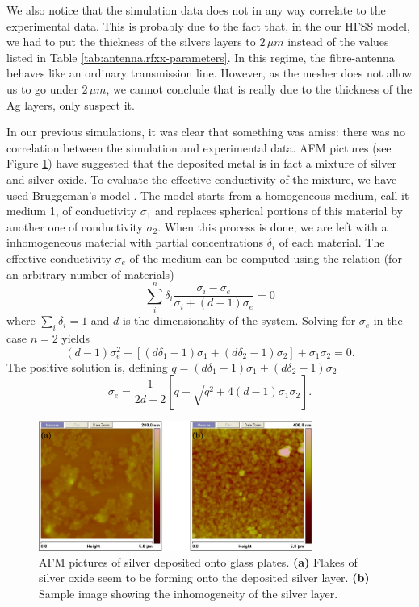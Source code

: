 We also notice that the simulation data does not in any way correlate
to the experimental data. This is probably due to the fact that, in the our
HFSS model, we had to put the thickness of the silvers layers to $2\,\unit{\mu m}$
instead of the values listed in Table \ref{tab:antenna.rfxx-parameters}. In 
this regime, the fibre-antenna behaves like an ordinary transmission line. 
However, as the mesher does not allow us to go under $2\,\unit{\mu m}$, we cannot
conclude that is really due to the thickness of the Ag layers, only suspect it.

In our previous simulations, it was clear that something was amiss:
there was no correlation between the simulation and
experimental data. AFM pictures (see Figure \ref{fig:antenna.AFM})  have suggested that the deposited
metal is in fact a mixture of silver and silver oxide. To evaluate
the effective conductivity of the mixture, we have used Bruggeman's model \cite{LAN1978}.
The model starts from a homogeneous medium, call it medium 1, 
of conductivity $\sigma_1$ and replaces spherical portions of this material 
by another one of conductivity $\sigma_2$. When this process is done, 
we are left with a inhomogeneous material with partial concentrations $\delta_i$
of each material. The effective conductivity $\sigma_e$ of the medium can be computed
using the relation (for an arbitrary number of materials)
  \begin{equation}
    \sum_i^n \delta_i \frac{\sigma_i-\sigma_e}{\sigma_i+(d-1)\sigma_e} =0 
  \end{equation}
where $\sum_i\delta_i=1$ and $d$ is the dimensionality of the system.
Solving for $\sigma_e$ in the case $n=2$ yields
  \begin{equation}
   (d-1)\sigma_e^2+\left[\left(d\delta_1-1\right)\sigma_1+\left(d\delta_2-1\right)\sigma_2\right]+\sigma_1\sigma_2=0.
  \end{equation}
The positive solution is, defining $q=\left(d\delta_1-1\right)\sigma_1+\left(d\delta_2-1\right)\sigma_2$
  \begin{equation}
   \label{eq:antenna:bruggeman}
   \sigma_e = \frac{1}{2d-2}\left[q+\sqrt{q^2+4(d-1)\sigma_1\sigma_2}\right].
  \end{equation}
  
\begin{figure}
 \centering
 \includegraphics[width=0.8\textwidth]{figs/active/out/AFM.pdf}
 \caption[AFM pictures of silver deposited onto glass plates]
 		{AFM pictures of silver deposited onto glass plates. \textbf{(a)} Flakes of silver oxide seem to be forming onto the deposited
	  	silver layer. \textbf{(b)} Sample image showing the inhomogeneity of the
	  	silver layer.}
 \label{fig:antenna.AFM}
\end{figure}


